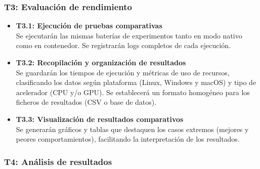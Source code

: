 \subsubsection{T3: Evaluación de rendimiento}\label{subsubsec:tareas_ob3}

\begin{itemize}[noitemsep]
      \item \textbf{T3.1: Ejecución de pruebas comparativas} \\
            Se ejecutarán las mismas baterías de experimentos tanto en modo nativo como en contenedor. Se registrarán logs completos de cada ejecución.

      \item \textbf{T3.2: Recopilación y organización de resultados} \\
            Se guardarán los tiempos de ejecución y métricas de uso de recursos, clasificando los datos según plataforma (Linux, Windows y macOS) y tipo de acelerador (CPU y/o GPU). Se establecerá un formato homogéneo para los ficheros de resultados (CSV o base de datos).

      \item \textbf{T3.3: Visualización de resultados comparativos} \\
            Se generarán gráficos y tablas que destaquen los casos extremos (mejores y peores comportamientos), facilitando la interpretación de los resultados.
\end{itemize}

\subsubsection{T4: Análisis de resultados}\label{subsubsec:tareas_ob4}

